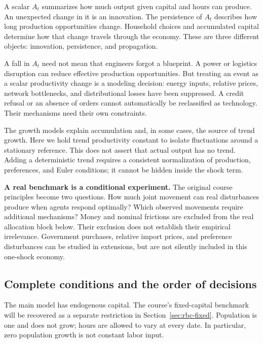 A scalar $A_t$ summarizes how much output given capital and hours can produce.
An unexpected change in it is an innovation. The persistence of $A_t$ describes
how long production opportunities change. Household choices and accumulated
capital determine how that change travels through the economy. These are three
different objects: innovation, persistence, and propagation.

A fall in $A_t$ need not mean that engineers forgot a blueprint. A power or
logistics disruption can reduce effective production opportunities. But treating
an event as a scalar productivity change is a modeling decision: energy inputs,
relative prices, network bottlenecks, and distributional losses have been
suppressed. A credit refusal or an absence of orders cannot automatically be
reclassified as technology. Their mechanisms need their own constraints.

The growth models explain accumulation and, in some cases, the source of trend
growth. Here we hold trend productivity constant to isolate fluctuations around
a stationary reference. This does not assert that actual output has no trend.
Adding a deterministic trend requires a consistent normalization of production,
preferences, and Euler conditions; it cannot be hidden inside the shock term.

\begin{blueblock}
\textbf{A real benchmark is a conditional experiment.}
The original course principles become two questions. How much joint movement
can real disturbances produce when agents respond optimally? Which observed
movements require additional mechanisms? Money and nominal frictions are
excluded from the real allocation block below. Their exclusion does not
establish their empirical irrelevance. Government purchases, relative import
prices, and preference disturbances can be studied in extensions, but are not
silently included in this one-shock economy.
\end{blueblock}

\subsection{Complete conditions and the order of decisions}\label{sec:rbc-conditions}

The main model has endogenous capital. The course's fixed-capital benchmark
will be recovered as a separate restriction in Section~\ref{sec:rbc-fixed}.
Population is one and does not grow; hours are allowed to vary at every date.
In particular, zero population growth is not constant labor input.

